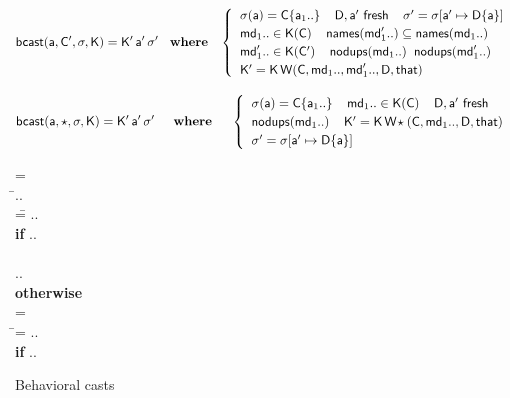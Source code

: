 \documentclass[runnningheads]{tex/llncs}
\begin{document}
\begin{figure}[!b]
\hrulefill
\small

\vspace{-4mm}

\begin{equation*}
  \behcastE\a\Cp\s\K \Kp\ap\sp \HS\WHERE\HS \begin{cases}
\HS  \App\s\a = \obj\C{\a[1]..} \HS\HS
  \fresh{\D,\ap} \HS\HS
  \sp = \Map \s{\Bind\ap{\obj\D{\a}}} \\\HS
  \md[1].. \In \App\K\C \HS\HS \names{\mdp[1]..} \subseteq \names{\md[1]..} \\\HS
  \mdp[1].. \In \App\K\Cp \HS\HS \cload{\md[1]..} \HS \cload{\mdp[1]..} \\\HS
  \Kp = \K\,\wrap\C{\md[1]..}{\mdp[1]..}\D\that 

  \end{cases}
\end{equation*}

\begin{equation*}
  \behcastE\a\any\s\K \Kp\ap\sp  \HS\HS\WHERE\HS\HS\begin{cases}\HS
  \App\s\a = \obj\C{\a[1]..} \HS\HS \md[1].. \In \App\K\C \HS\HS
  \fresh{\D,\ap} \\\HS \cload{\md[1]..} \HS\HS
  \Kp = \K\,\wrapAny\C{\md[1]..}\D\that \\\HS
  \sp = \Map \s{\Bind\ap{\obj\D{\a}}} 
\end{cases}\end{equation*}


\hrulefill
\vspace{-2mm}\caption{Behavioral casts}\label{behavetext}

\hrulefill
\small

\begin{tabbing}\small
  \wrap{}\D\that = \\
  \HS\HS\WHERE\HS\= \Mdef\m\x{\t[1]}{\t[2]}\e\In\md[1].. \\
                 \> \mdpp[1] =\= \src{\Mdef\m\x{\tp[1]}{\tp[2]}{~\BehCast{\tp[2]}{\KCall{\FRead\that}\m{\bscast{\tp[1]}\x}{\t[1]}{\t[2]}}}} .. \\
\> \> \HS\HS \= \textbf{if} \HS \Mdef\m\x{\tp[1]}{\tp[2]}\ep\In\mdp[1].. \\
\\[-3mm]
\> \>  \src{\Mdef\m\x{\t[1]}{\t[2]}{~\KCall{\FRead\that}\m{\x}{\t[1]}{\t[2]}}} .. \\ \> \> \HS\HS \textbf{otherwise}
\\[3mm]
   = \\
\HS\HS\WHERE\HS\=\mdp[1] = \src{ \Mdef\m\x{\any}{\any}{~\BehCast\any{ \KCall{\FRead\that} \m {\bscast{\t}\x}{\t}{\tp}} } }   ..
    \HS\HS\HS\HS \\ \> \> \HS\HS \= \textbf{if} \HS \Mdef\m\x{\t}{\tp}\e\In\md[1].. \\
\end{tabbing}


\end{figure}
\end{document}
